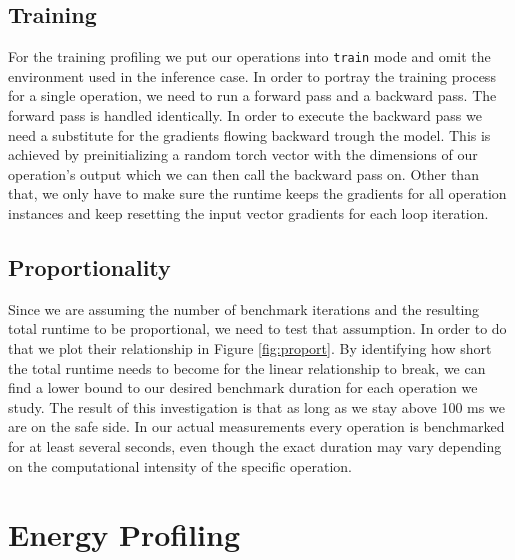 \subsection{Training}
For the training profiling we put our operations into \texttt{train} mode and omit the environment used in the inference case. In order to portray the training process for a single operation, we need to run a forward pass and a backward pass. The forward pass is handled identically. In order to execute the backward pass we need a substitute for the gradients flowing backward trough the model. This is achieved by preinitializing a random torch vector with the dimensions of our operation's output which we can then call the backward pass on. Other than that, we only have to make sure the runtime keeps the gradients for all operation instances and keep resetting the input vector gradients for each loop iteration.

\subsection{Proportionality}
Since we are assuming the number of benchmark iterations and the resulting total runtime to be proportional, we need to test that assumption. In order to do that we plot their relationship in Figure \ref{fig:proport}. By identifying how short the total runtime needs to become for the linear relationship to break, we can find a lower bound to our desired benchmark duration for each operation we study. The result of this investigation is that as long as we stay above 100 ms we are on the safe side. In our actual measurements every operation is benchmarked for at least several seconds, even though the exact duration may vary depending on the computational intensity of the specific operation.


\section{Energy Profiling}

% 

